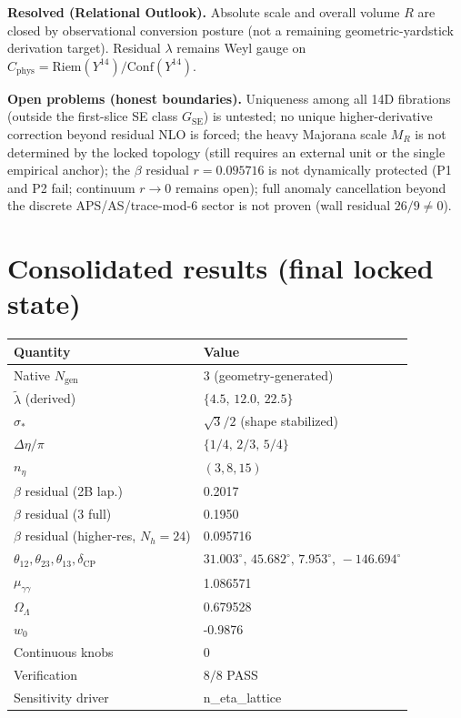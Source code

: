 \documentclass{article}
\begin{document}
\textbf{Resolved (Relational Outlook).}
Absolute scale and overall volume $R$ are closed by observational conversion
posture (not a remaining geometric-yardstick derivation target).
Residual $\lambda$ remains Weyl gauge on
$C_{\mathrm{phys}}=\mathrm{Riem}(Y^{14})/\mathrm{Conf}(Y^{14})$.

\textbf{Open problems (honest boundaries).}
Uniqueness among all 14D fibrations (outside the first-slice SE class $G_{\mathrm{SE}}$) is untested;
no unique higher-derivative correction beyond residual NLO is forced; the heavy Majorana scale $M_R$ is not determined by the locked topology
(still requires an external unit or the single empirical anchor);
the $\beta$ residual $r=0.095716$ is not dynamically protected (P1 and P2 fail; continuum $r\to 0$ remains open);
full anomaly cancellation beyond the discrete APS/AS/trace-mod-6 sector is not proven (wall residual $26/9\neq 0$).

\section{Consolidated results (final locked state)}
\begin{center}
\begin{tabular}{ll}
\hline
Quantity & Value \\
\hline
Native $N_{\mathrm{gen}}$ & $3$ (geometry-generated) \\
$\tilde\lambda$ (derived) & $\{4.5,\,12.0,\,22.5\}$ \\
$\sigma_*$ & $\sqrt{3}/2$ (shape stabilized) \\
$\Delta\eta/\pi$ & $\{1/4,\,2/3,\,5/4\}$ \\
$n_\eta$ & $(3,8,15)$ \\
$\beta$ residual (2B lap.) & 0.2017 \\
$\beta$ residual (3 full) & 0.1950 \\
$\beta$ residual (higher-res, $N_h=24$) & 0.095716 \\
$\theta_{12},\theta_{23},\theta_{13},\delta_{\mathrm{CP}}$ & $31.003^\circ,\,45.682^\circ,\,7.953^\circ,\,-146.694^\circ$ \\
$\mu_{\gamma\gamma}$ & 1.086571 \\
$\Omega_\Lambda$ & 0.679528 \\
$w_0$ & -0.9876 \\
Continuous knobs & 0 \\
Verification & $8/8$ PASS \\
Sensitivity driver & n_eta_lattice \\
\hline
\end{tabular}
\end{center}
\end{document}

